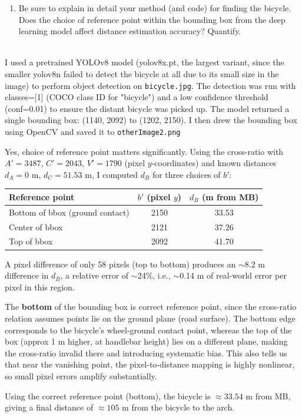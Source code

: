 \begin{enumerate}
\item Be sure to  explain in detail your method (and code) for finding the bicycle. Does the choice of reference point within the bounding box from the deep learning model affect distance estimation accuracy? Quantify.
\end{enumerate}
\begin{studentSpace}
    \\I used a pretrained YOLOv8 model (yolov8x.pt, the largest variant, since the smaller yolov8n failed to detect the bicycle at all due to its small size in the image) to perform object detection on \texttt{bicycle.jpg}. The detection was run with classes=[1] (COCO class ID for "bicycle") and a low confidence threshold (conf=0.01) to ensure the distant bicycle was picked up. The model returned a single bounding box: (1140, 2092) to (1202, 2150). I then drew the bounding box using OpenCV and saved it to \texttt{otherImage2.png}

    Yes, choice of reference point matters significantly. Using the cross-ratio with $A'=3487$, $C'=2043$, $V'=1790$ (pixel $y$-coordinates) and known distances $d_A=0$ m, $d_C=51.53$ m, I computed $d_B$ for three choices of $b'$:

    \begin{center}
    \begin{tabular}{lcc}
    \hline
    Reference point & $b'$ (pixel $y$) & $d_B$ (m from MB) \\
    \hline
    Bottom of bbox (ground contact) & 2150 & 33.53 \\
    Center of bbox & 2121 & 37.26 \\
    Top of bbox & 2092 & 41.70 \\
    \hline
    \end{tabular}
    \end{center}
    
    A pixel difference of only 58 pixels (top to bottom) produces an $\sim$8.2 m difference in $d_B$, a relative error of $\sim$24\%, i.e., $\sim$0.14 m of real-world error per pixel in this region.
    
    The \textbf{bottom} of the bounding box is correct reference point, since the cross-ratio relation assumes points lie on the ground plane (road surface). The bottom edge corresponds to the bicycle's wheel-ground contact point, whereas the top of the box (approx 1 m higher, at handlebar height) lies on a different plane, making the cross-ratio invalid there and introducing systematic bias. This also tells us that near the vanishing point, the pixel-to-distance mapping is highly nonlinear, so small pixel errors amplify substantially.
    
    Using the correct reference point (bottom), the bicycle is $\approx 33.54$ m from MB, giving a final distance of $\approx 105$ m from the bicycle to the arch.
\end{studentSpace}


